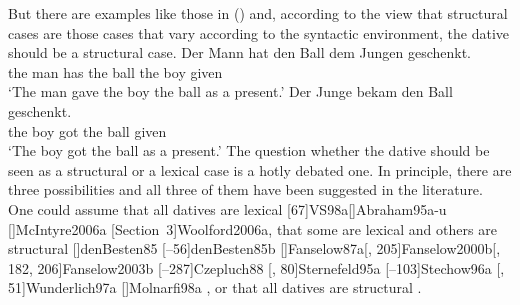 But there are examples like those in () and, according to the view that structural cases are
those cases that vary according to the syntactic environment, the dative should be a structural case.
\eal
\ex 
\gll Der Mann  hat   den Ball dem Jungen geschenkt.\\
     the man   has   the ball the boy given\\
\glt `The man gave the boy the ball as a present.'
\ex 
\gll Der Junge bekam den Ball geschenkt.\\
     the boy   got   the ball given\\   
\glt `The boy got the ball as a present.'
\zl
The question whether the dative should be seen as a structural or a lexical case is a hotly debated
one. In principle, there are three possibilities and all three of them have been suggested in the
literature. One could assume that all datives are lexical 
\parencites[]{Haider85b}%
[]{Haider86}[, 217, 228]{HM94a}%
{Mueller99a,Mueller2001a}[]{Mueller2003e}%
[]{Scherpenisse86a}%
[, 291]{Pollard94a}%
[67]{VS98a}[]{Abraham95a-u}%
[]{McIntyre2006a}%
[Section~3]{Woolford2006a},
that some are lexical and others are structural 
\parencites
{Wegener85a}%
{Wegener90}%
[]{denBesten85}%
[--56]{denBesten85b}%
[]{Fanselow87a}[, 205]{Fanselow2000b}[, 182, 206]{Fanselow2003b}%
[--287]{Czepluch88}%
[, 80]{Sternefeld95a}%
[--103]{Stechow96a}%
[, 51]{Wunderlich97a}%
[]{Molnarfi98a}%
, or that all datives are structural 
\parencites[]{Sternefeld95a}%
[, 205--206]{Ryu97a}%
[--97]{Gunkel2003b}.%

